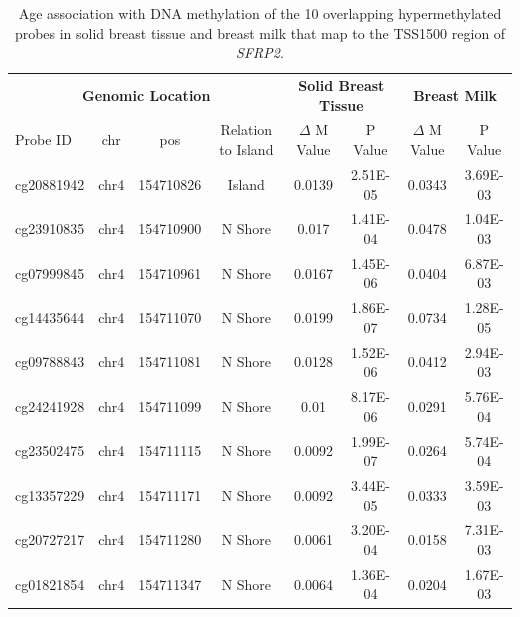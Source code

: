 \documentclass[12pt]{article}
\begin{document}
\begin{table}[h] %
\begin{tabular}{lccccccc}
\multicolumn{4}{c}{\textbf{Genomic Location}}      & \multicolumn{2}{c}{\textbf{Solid Breast Tissue}} & \multicolumn{2}{c}{\textbf{Breast Milk}} \\
Probe ID   & chr  & pos       & Relation to Island & $\Delta$ M Value               & P Value               & $\Delta$ M Value           & P Value           \\ \hline
cg20881942 & chr4 & 154710826 & Island             & 0.0139                   & 2.51E-05              & 0.0343               & 3.69E-03          \\
cg23910835 & chr4 & 154710900 & N Shore            & 0.017                    & 1.41E-04              & 0.0478               & 1.04E-03          \\
cg07999845 & chr4 & 154710961 & N Shore            & 0.0167                   & 1.45E-06              & 0.0404               & 6.87E-03          \\
cg14435644 & chr4 & 154711070 & N Shore            & 0.0199                   & 1.86E-07              & 0.0734               & 1.28E-05          \\
cg09788843 & chr4 & 154711081 & N Shore            & 0.0128                   & 1.52E-06              & 0.0412               & 2.94E-03          \\
cg24241928 & chr4 & 154711099 & N Shore            & 0.01                     & 8.17E-06              & 0.0291               & 5.76E-04          \\
cg23502475 & chr4 & 154711115 & N Shore            & 0.0092                   & 1.99E-07              & 0.0264               & 5.74E-04          \\
cg13357229 & chr4 & 154711171 & N Shore            & 0.0092                   & 3.44E-05              & 0.0333               & 3.59E-03          \\
cg20727217 & chr4 & 154711280 & N Shore            & 0.0061                   & 3.20E-04              & 0.0158               & 7.31E-03          \\
cg01821854 & chr4 & 154711347 & N Shore            & 0.0064                   & 1.36E-04              & 0.0204               & 1.67E-03         
\end{tabular}
\caption{Age association with DNA methylation of the 10 overlapping hypermethylated probes in solid breast tissue and breast milk that map to the TSS1500 region of \textit{SFRP2}.}
\label{tab:SFRP2}
\end{table}
\end{document}
